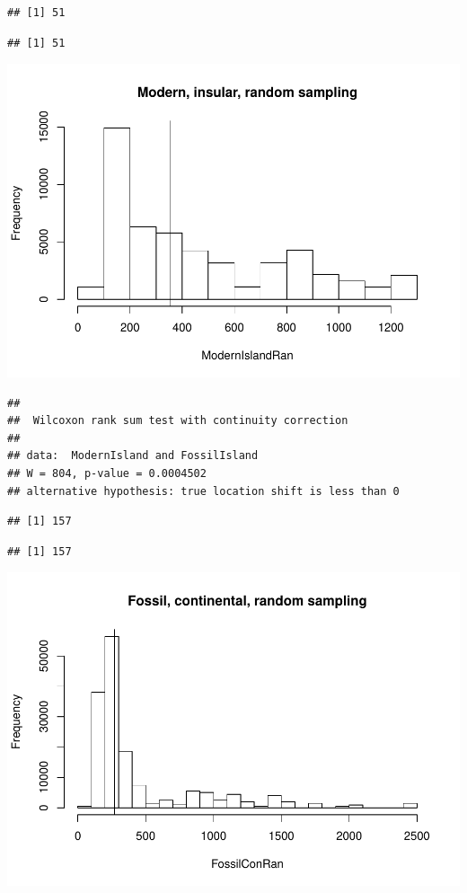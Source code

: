\documentclass[]{article}
\begin{document}
\begin{verbatim}
## [1] 51
\end{verbatim}

\begin{verbatim}
## [1] 51
\end{verbatim}

\includegraphics{MA_JJ_files/figure-latex/RSMFCI-1.pdf}

\begin{verbatim}
## 
##  Wilcoxon rank sum test with continuity correction
## 
## data:  ModernIsland and FossilIsland
## W = 804, p-value = 0.0004502
## alternative hypothesis: true location shift is less than 0
\end{verbatim}

\begin{verbatim}
## [1] 157
\end{verbatim}

\begin{verbatim}
## [1] 157
\end{verbatim}

\includegraphics{MA_JJ_files/figure-latex/RSMFCI-2.pdf}
\end{document}
